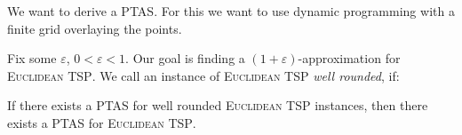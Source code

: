 \documentclass[../skript.tex]{subfiles}
\begin{document}
We want to derive a \ac{PTAS}. For this we want to use dynamic programming with a finite grid overlaying the points.

Fix some $\varepsilon$, $0 < \varepsilon < 1$. Our goal is finding a $(1 + \varepsilon)$-approximation for \textsc{Euclidean TSP}.
We call an instance of \textsc{Euclidean TSP} \emph{well rounded}, if:
\begin{theorem} %
\label{thm:93}
If there exists a \ac{PTAS} for well rounded \textsc{Euclidean TSP} instances, then there exists a \ac{PTAS} for \textsc{Euclidean TSP}.
\end{theorem}
\end{document}
